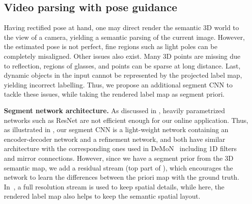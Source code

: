 \subsection{Video parsing with pose guidance}
\label{subsec:parsing}
Having rectified pose at hand, one may direct render the semantic 3D world to the view of a camera, yielding a semantic parsing of the current image. However, the estimated pose is not perfect, fine regions such as light poles can be completely misaligned. Other issues also exist. Many 3D points are missing due to reflection, \eg regions of glasses, and points can be sparse at long distance. Last, dynamic objects in the input cannot be represented by the projected label map, yielding incorrect labelling. Thus, we propose an additional segment CNN to tackle these issues, while taking the rendered label map as segment priori.

\textbf{Segment network architecture.} As discussed in , heavily parametrized networks such as ResNet are not efficient enough for our online application. Thus, as illustrated in , our segment CNN is a light-weight network containing an encoder-decoder network and a refinement network, and both have similar architecture with the corresponding ones used in DeMoN~\cite{ummenhofer2016demon} including 1D filters and mirror connections. However, since we have a segment prior from the 3D semantic map, we add a residual stream (top part of ), which encourages the network to learn the differences between the priori map with the ground truth. In~\cite{pohlen2016full}, a full resolution stream is used to keep spatial details, while here, the rendered label map also helps to keep the semantic spatial layout.

